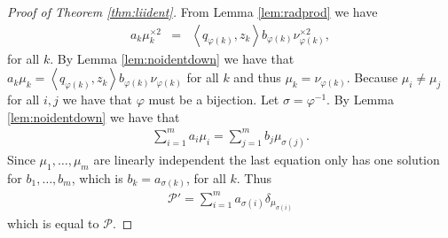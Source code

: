 \documentclass[aos,preprint]{imsart}
\def\l{\left}
\def\r{\right}
\def\sP{\mathscr{P}}
\theoremstyle{plain}
\theoremstyle{defintion}
\begin{document}
\begin{proof}[Proof of Theorem \ref{thm:liident}]
		From Lemma \ref{lem:radprod} we have
		\begin{eqnarray*}
			a_k \mu_k^{\times 2} &=& \l<q_{\varphi\left( k \right)},z_k\r>b_{\varphi\left( k \right)} \nu_{\varphi\left( k \right)}^{\times 2},
		\end{eqnarray*}
		for all $k$.
		By Lemma \ref{lem:noidentdown} we have that $a_k \mu_k = \l<q_{\varphi\left( k \right)},z_k\r>b_{\varphi\left( k \right)} \nu_{\varphi\left( k \right)}$ for all $k$ and thus $\mu_k = \nu_{\varphi\left( k \right)}$. Because $\mu_i \neq \mu_j$ for all $i,j$ we have that $\varphi$ must be a bijection. Let $\sigma = \varphi^{-1}.$
		By Lemma \ref{lem:noidentdown} we have that
		\begin{eqnarray*}
			\sum_{i=1}^m a_i \mu_i = \sum_{j=1}^m b_j \mu_{\sigma\left( j \right)}.
		\end{eqnarray*}
		Since $\mu_1,\ldots,\mu_m$ are linearly independent the last equation only has one solution for $b_1,\ldots,b_m$, which is $b_k = a_{\sigma\left( k \right)}$, for all $k$. Thus
		\begin{eqnarray*}
			\sP' = \sum_{i=1}^m a_{\sigma\left( i \right)} \delta_{ \mu_{\sigma\left( i \right)}}
		\end{eqnarray*}
		which is equal to $\sP$.
	\end{proof}
\end{document}
